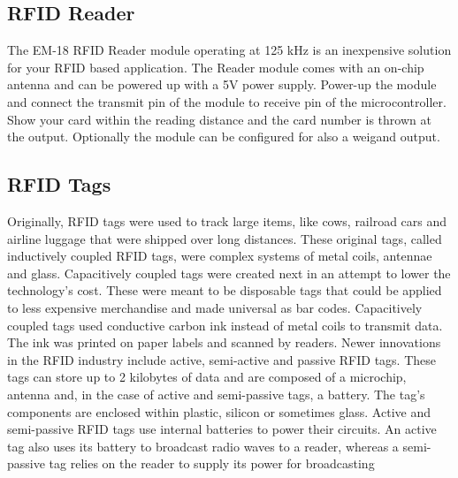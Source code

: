 \documentclass[a4paper,29.6pt]{article}
\begin{document}
\subsection{RFID Reader}
\begin{small}
The EM-18 RFID Reader module operating at 125 kHz is an inexpensive solution for your RFID based application. The Reader module comes with an on-chip antenna and can be powered up with a 5V power supply. 
Power-up the module and connect the transmit pin of the module to receive pin of the microcontroller. Show your card within the reading distance and the card number is thrown at the output. Optionally the module can be configured for also a weigand output.\\


\subsection{RFID Tags}
\begin{small}
Originally, RFID tags were used to track large items, like cows, railroad cars and airline luggage that were shipped over long distances. These original tags, called inductively coupled RFID tags, were complex systems of metal coils, antennae and glass.
Capacitively coupled tags were created next in an attempt to lower the technology's cost. These were meant to be disposable tags that could be applied to less expensive merchandise and made universal as bar codes. Capacitively coupled tags used conductive carbon ink instead of metal coils to transmit data. The ink was printed on paper labels and scanned by readers.
Newer innovations in the RFID industry include active, semi-active and passive RFID tags. These tags can store up to 2 kilobytes of data and are composed of a microchip, antenna and, in the case of active and semi-passive tags, a battery. The tag's components are enclosed within plastic, silicon or sometimes glass.
Active and semi-passive RFID tags use internal batteries to power their circuits. An active tag also uses its battery to broadcast radio waves to a reader, whereas a semi-passive tag relies on the reader to supply its power for broadcasting

\end{small}



\end{small}
\end{document}
